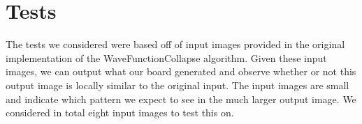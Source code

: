 \documentclass[10pt]{article}
\begin{document}
\newpage
\section{Tests}
The tests we considered were based off of input images provided in the original implementation of the WaveFunctionCollapse algorithm. Given these input images, we can output what our board generated and observe whether or not this output image is locally similar to the original input. The input images are small and indicate which pattern we expect to see in the much larger output image. We considered in total eight input images to test this on.
\end{document}
